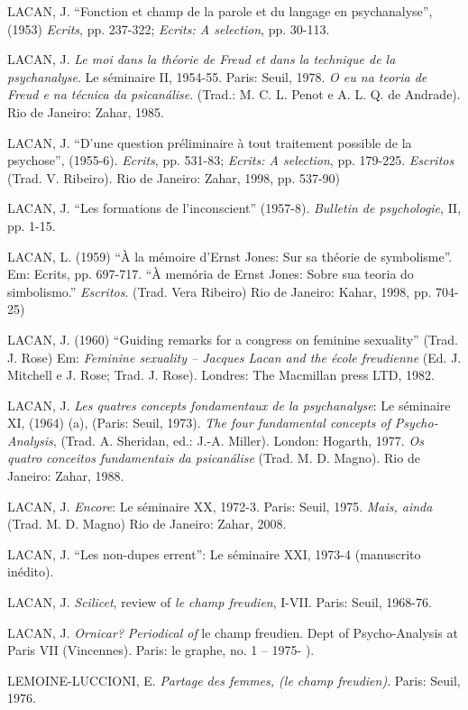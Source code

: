LACAN, J. ``Fonction et champ de la parole et du langage en
psychanalyse'', (1953) \emph{Ecrits}, pp. 237-322; \emph{Ecrits: A
selection}, pp. 30-113.

LACAN, J. \emph{Le moi dans la théorie de Freud et dans la technique de
la psychanalyse}. Le séminaire II, 1954-55. Paris: Seuil, 1978. \emph{O
eu na teoria de Freud e na técnica da psicanálise}. (Trad.: M. C. L.
Penot e A. L. Q. de Andrade). Rio de Janeiro: Zahar, 1985.

LACAN, J. ``D'une question préliminaire à tout traitement possible de la
psychose'', (1955-6). \emph{Ecrits}, pp. 531-83; \emph{Ecrits: A
selection}, pp. 179-225. \emph{Escritos} (Trad. V. Ribeiro). Rio de
Janeiro: Zahar, 1998, pp. 537-90)

LACAN, J. ``Les formations de l'inconscient'' (1957-8). \emph{Bulletin de
psychologie}, II, pp. 1-15.

LACAN, L. (1959) ``À la mémoire d'Ernst Jones: Sur sa théorie de
symbolisme''. Em: Ecrits, pp. 697-717. ``À memória de Ernst Jones: Sobre
sua teoria do simbolismo.'' \emph{Escritos}. (Trad. Vera Ribeiro) Rio
de Janeiro: Kahar, 1998, pp. 704-25)

LACAN, J. (1960) ``Guiding remarks for a congress on feminine sexuality''
(Trad. J. Rose) Em: \emph{Feminine sexuality -- Jacques Lacan and the
école freudienne} (Ed. J. Mitchell e J. Rose; Trad. J. Rose).
Londres: The Macmillan press LTD, 1982.

LACAN, J. \emph{Les quatres concepts fondamentaux de la psychanalyse}:
Le séminaire XI, (1964) (a), (Paris: Seuil, 1973). \emph{The four
fundamental concepts of Psycho-Analysis}, (Trad. A. Sheridan, ed.:
J.-A. Miller). London: Hogarth, 1977. \emph{Os quatro conceitos
fundamentais da psicanálise} (Trad. M. D. Magno). Rio de Janeiro:
Zahar, 1988.

LACAN, J. \emph{Encore}: Le séminaire XX, 1972-3. Paris: Seuil, 1975.
\emph{Mais, ainda} (Trad. M. D. Magno) Rio de Janeiro: Zahar, 2008.

LACAN, J. ``Les non-dupes errent'': Le séminaire XXI, 1973-4 (manuscrito
inédito).

LACAN, J. \emph{Scilicet}, review of \emph{le champ freudien}, I-VII.
Paris: Seuil, 1968-76.

LACAN, J. \emph{Ornicar?} \emph{Periodical of} le champ freudien. Dept
of Psycho-Analysis at Paris VII (Vincennes). Paris: le graphe, no. 1 --
1975- ).

LEMOINE-LUCCIONI, E. \emph{Partage des femmes, (le champ freudien)}.
Paris: Seuil, 1976.

